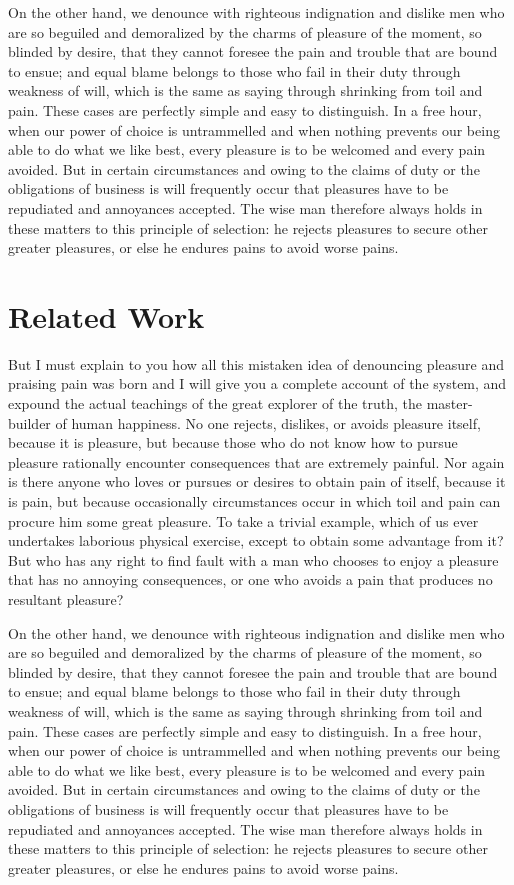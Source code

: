 On the other hand, we denounce with righteous indignation and dislike men who are so beguiled and demoralized by the charms of pleasure of the moment, so blinded by desire, that they cannot foresee the pain and trouble that are bound to ensue; and equal blame belongs to those who fail in their duty through weakness of will, which is the same as saying through shrinking from toil and pain. These cases are perfectly simple and easy to distinguish. In a free hour, when our power of choice is untrammelled and when nothing prevents our being able to do what we like best, every pleasure is to be welcomed and every pain avoided. But in certain circumstances and owing to the claims of duty or the obligations of business is will frequently occur that pleasures have to be repudiated and annoyances accepted. The wise man therefore always holds in these matters to this principle of selection: he rejects pleasures to secure other greater pleasures, or else he endures pains to avoid worse pains. 

\section{Related Work}

But I must explain to you how all this mistaken idea of denouncing pleasure and praising pain was born and I will give you a complete account of the system, and expound the actual teachings of the great explorer of the truth, the master-builder of human happiness. No one rejects, dislikes, or avoids pleasure itself, because it is pleasure, but because those who do not know how to pursue pleasure rationally encounter consequences that are extremely painful. Nor again is there anyone who loves or pursues or desires to obtain pain of itself, because it is pain, but because occasionally circumstances occur in which toil and pain can procure him some great pleasure. To take a trivial example, which of us ever undertakes laborious physical exercise, except to obtain some advantage from it? But who has any right to find fault with a man who chooses to enjoy a pleasure that has no annoying consequences, or one who avoids a pain that produces no resultant pleasure?

On the other hand, we denounce with righteous indignation and dislike men who are so beguiled and demoralized by the charms of pleasure of the moment, so blinded by desire, that they cannot foresee the pain and trouble that are bound to ensue; and equal blame belongs to those who fail in their duty through weakness of will, which is the same as saying through shrinking from toil and pain. These cases are perfectly simple and easy to distinguish. In a free hour, when our power of choice is untrammelled and when nothing prevents our being able to do what we like best, every pleasure is to be welcomed and every pain avoided. But in certain circumstances and owing to the claims of duty or the obligations of business is will frequently occur that pleasures have to be repudiated and annoyances accepted. The wise man therefore always holds in these matters to this principle of selection: he rejects pleasures to secure other greater pleasures, or else he endures pains to avoid worse pains. 